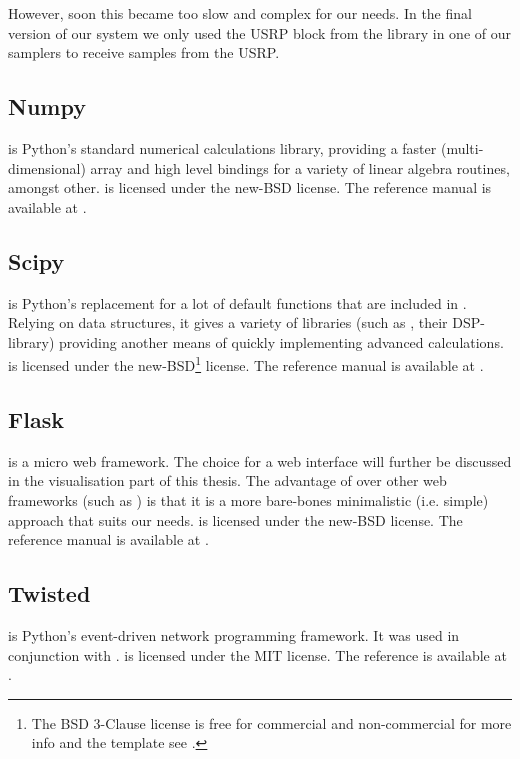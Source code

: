 \documentclass[a4paper, openany, oneside]{memoir}
\begin{document}
 However, soon this became too slow and complex for our needs. In the final version of our system we only used the USRP block from the   library in one of our samplers to receive samples from the USRP.


\subsection{Numpy}
\label{sec:numpy}
 is Python's standard numerical calculations library, providing a faster (multi-dimensional) array and high level bindings for a variety of linear algebra routines, amongst other.  is licensed under the new-BSD license. The reference manual is available at \cite{numpyscipy}.

\subsection{Scipy}
\label{sec:scipy}
 is Python's replacement for a lot of default functions that are included in \matlab{}. Relying on  data structures, it gives a variety of libraries (such as , their DSP-library) providing another means of quickly implementing advanced calculations.  is licensed under the new-BSD\footnote{\label{fn:bsd}The BSD 3-Clause license is free for commercial and non-commercial for more info and the template see \cite{bsdlic}.} license. The reference manual is available at \cite{numpyscipy}.

\subsection{Flask}
\label{sec:flask}
 is a micro web framework. The choice for a web interface will further be discussed in the visualisation part of this thesis. The advantage of  over other web frameworks (such as ) is that it is a more bare-bones minimalistic (i.e. simple) approach that suits our needs.  is licensed under the new-BSD license. The reference manual is available at \cite{flask}.

\subsection{Twisted}
\label{sub:twisted}
 is Python's event-driven network programming framework. It was used in conjunction with .  is licensed under the MIT license. The reference is available at \cite{twisted}.
\end{document}
